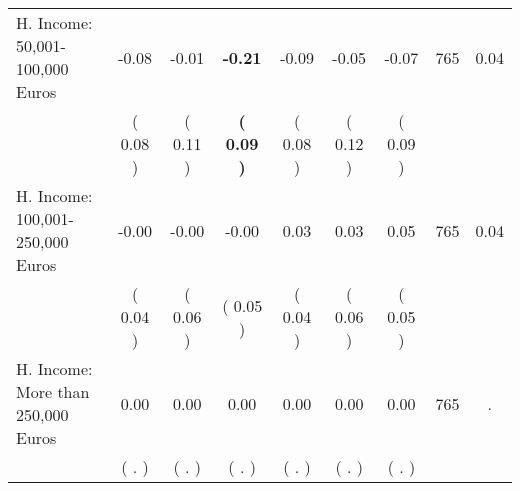 \begin{tabular}{lcccccccc}
H. Income: 50,001-100,000 Euros &     -0.08 &     -0.01 & \textbf{    -0.21} &     -0.09 &     -0.05 &     -0.07 & 765 &       0.04 \\ 
 & (     0.08 ) & (     0.11 ) & \textbf{(     0.09 )} & (     0.08 ) & (     0.12 ) & (     0.09 ) & \\
H. Income: 100,001-250,000 Euros &     -0.00 &     -0.00 &     -0.00 &      0.03 &      0.03 &      0.05 & 765 &       0.04 \\ 
 & (     0.04 ) & (     0.06 ) & (     0.05 ) & (     0.04 ) & (     0.06 ) & (     0.05 ) & \\
H. Income: More than 250,000 Euros &      0.00 &      0.00 &      0.00 &      0.00 &      0.00 &      0.00 & 765 &          . \\ 
 & (        . ) & (        . ) & (        . ) & (        . ) & (        . ) & (        . ) & \\
\bottomrule
\end{tabular}
